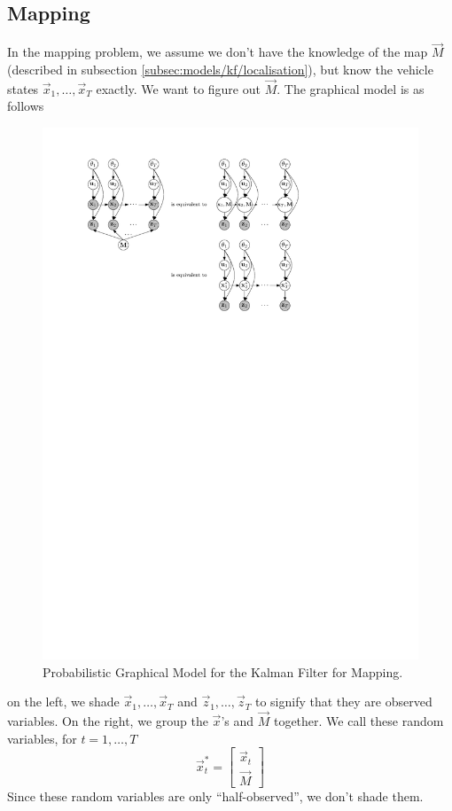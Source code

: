 \subsection{Mapping}
\label{sec:models/kf/mapping}
In the mapping problem, we assume we don't have the knowledge of the map $\vec M$ (described in subsection \ref{subsec:models/kf/localisation}), but know the vehicle states $\vec x_1, \dotsc, \vec x_T$ exactly. We want to figure out $\vec M$. The graphical model is as follows
\begin{figure}[!htb]
\centering
\includegraphics[scale=1]{models/kf/figures/kf-map}
\caption{Probabilistic Graphical Model for the Kalman Filter for Mapping.}
\label{fig:models/kf/figures/kf-map}
\end{figure}

on the left, we shade $\vec x_1, \dotsc, \vec x_T$ and $\vec z_1, \dotsc, \vec z_T$ to signify that they are observed variables. On the right, we group the $\vec x$'s and $\vec M$ together. We call these random variables, for $t = 1, \dotsc, T$
\begin{equation}
	\vec x_t^\ast =
		\begin{bmatrix}
			\vec x_t \\
			\vec M
		\end{bmatrix}
\end{equation}
Since these random variables are only ``half-observed'', we don't shade them.

